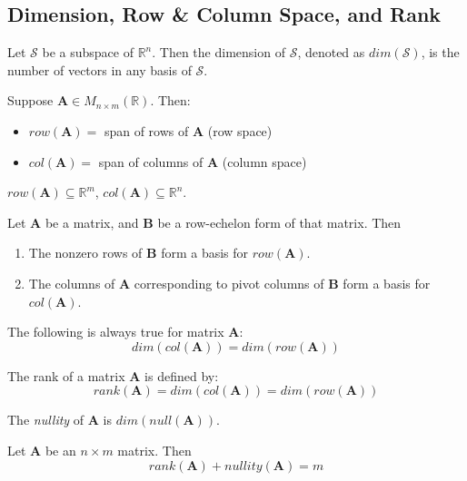 
\subsection{Dimension, Row \& Column Space, and Rank}
\begin{definition}[Dimension]
Let $\mathcal{S}$ be a subspace of $\mathbb{R}^n$. Then the dimension of $\mathcal{S}$, denoted as $dim(\mathcal{S})$, is the number of vectors in any basis of $\mathcal{S}$.
\end{definition}

\begin{definition}
Suppose $\bm{A}\in M_{n\times m}(\mathbb{R})$. Then:
\begin{itemize}
    \item $row(\bm{A})=$ span of rows of $\bm{A}$ (row space)
    \item $col(\bm{A})=$ span of columns of $\bm{A}$ (column space)
\end{itemize}
$row(\bm{A})\subseteq\mathbb{R}^m$, $col(\bm{A})\subseteq\mathbb{R}^n$.
\end{definition}

\begin{theorem}
Let $\bm{A}$ be a matrix, and $\bm{B}$ be a row-echelon form of that matrix. Then
\begin{enumerate}[label=\alph*)]
    \item The nonzero rows of $\bm{B}$ form a basis for $row(\bm{A})$.
    \item The columns of $\bm{A}$ corresponding to pivot columns of $\bm{B}$ form a basis for $col(\bm{A})$.
\end{enumerate}
\end{theorem}

\begin{theorem}
The following is always true for matrix $\bm{A}$:
\begin{equation}
    dim(col(\bm{A})) = dim(row(\bm{A}))
\end{equation}
\end{theorem}

\begin{definition}[Rank]
The rank of a matrix $\bm{A}$ is defined by:
\begin{equation}
    rank(\bm{A}) = dim(col(\bm{A})) = dim(row(\bm{A}))
\end{equation}
\end{definition}

\begin{definition}[Nullity]
The \emph{nullity} of $\bm{A}$ is $dim(null(\bm{A}))$.
\end{definition}

\begin{theorem}
Let $\bm{A}$ be an $n\times m$ matrix. Then
\begin{equation}
    rank(\bm{A}) + nullity(\bm{A})=m
\end{equation}
\end{theorem}
